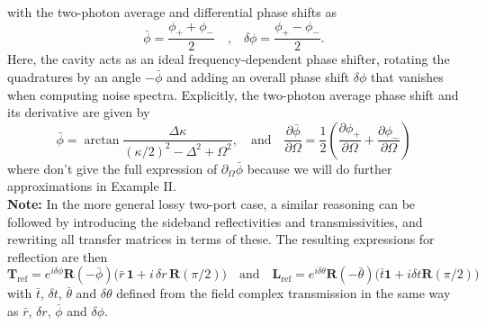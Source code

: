 with the two-photon average and differential phase shifts as
\begin{equation*}
  \bar \phi = \frac{\phi_+ + \phi_-}{2} \quad \text{,} \quad  \delta \phi = \frac{\phi_+ - \phi_-}{2}.
\end{equation*}
Here, the cavity acts as an ideal frequency-dependent phase shifter, rotating the quadratures by an angle $- \bar \phi$ and adding an overall phase shift $\delta \phi$ that vanishes when computing noise spectra. Explicitly, the two-photon average phase shift and its derivative are given by 
\begin{equation}
    \bar \phi =  \arctan \dfrac{\Delta \kappa}{(\kappa/2)^2 - \Delta^2 + \Omega^2}, \quad \text{and} \quad \dfrac{\partial \bar \phi}{\partial \Omega} = \frac{1}{2} \left( \dfrac{\partial \phi_+}{\partial \Omega} + \dfrac{\partial \phi_-}{\partial \Omega} \right)
\end{equation}
where don't give the full expression of $\partial_\Omega \bar \phi$ because we will do further approximations in Example II. \\ 

\noindent \textbf{Note:} In the more general lossy two-port case, a similar reasoning can be followed by introducing the sideband reflectivities and transmissivities, and rewriting all transfer matrices in terms of these. The resulting expressions for reflection are then 
\begin{equation}
  \mathbf{T}_{\mathrm{ref}} = e^{i\delta \phi} \mathbf{R}\left(- \bar \phi \right) \Big(\bar r \,  \mathbf{1} + i \, \delta r \,  \mathbf{R}\left(\pi/2\right)\Big) \quad \text{and} \quad
  \mathbf{L}_{\mathrm{ref}} = e^{i\delta \theta} \mathbf{R}\left(- \bar \theta \right)\Big(\bar t \mathbf{1} + i \delta t \mathbf{R}  \left(\pi/2\right)\Big)
\end{equation}
with $\bar t$, $\delta t$, $\bar \theta$ and $\delta \theta$ defined from the field complex transmission in the same way as $\bar r$, $\delta r$, $\bar \phi$ and $\delta \phi$.  


